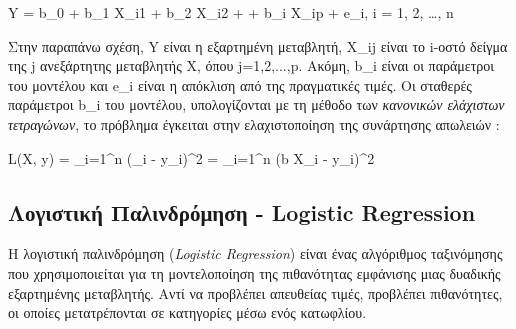 \documentclass[diploma]{softlab-thesis}
\begin{document}
Y = b_0 + b_1 X_{i1} + b_2 X_{i2} + \cdots + b_i X_{ip} + e_i, \quad {} i = 1, 2, \ldots, n \vspace{1cm}


Στην παραπάνω σχέση, Y είναι η εξαρτημένη μεταβλητή, X_{ij} είναι το i-οστό δείγμα της j ανεξάρτητης μεταβλητής X, όπου j=1,2,...,p. Ακόμη, b_i είναι οι παράμετροι του μοντέλου και e_i είναι η απόκλιση από της πραγματικές τιμές. Οι σταθερές παράμετροι b_i του μοντέλου, υπολογίζονται με τη μέθοδο των \textit{κανονικών ελάχιστων τετραγώνων}, το πρόβλημα έγκειται στην ελαχιστοποίηση της συνάρτησης απωλειών : \vspace{1cm}

L(X, y) = \sum_{i=1}^n (_i - y_i)^2 = \sum_{i=1}^n (b \cdot X_i - y_i)^2 \vspace{1cm}

\subsection{Λογιστική Παλινδρόμηση - Logistic Regression}

Η λογιστική παλινδρόμηση (\textit{Logistic Regression}) είναι ένας αλγόριθμος ταξινόμησης που χρησιμοποιείται για τη μοντελοποίηση της πιθανότητας εμφάνισης μιας δυαδικής εξαρτημένης μεταβλητής. Αντί να προβλέπει απευθείας τιμές, προβλέπει πιθανότητες, οι οποίες μετατρέπονται σε κατηγορίες μέσω ενός κατωφλίου.
\end{document}

